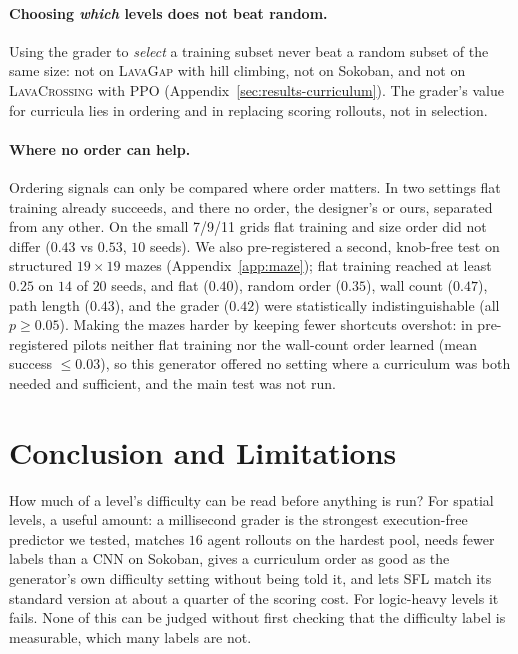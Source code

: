 \documentclass[twoside]{article}
\begin{document}
\paragraph{Choosing \emph{which} levels does not beat random.} Using the grader to \emph{select} a training subset never beat a random subset of the same size: not on \textsc{LavaGap} with hill climbing, not on Sokoban, and not on \textsc{LavaCrossing} with PPO (Appendix~\ref{sec:results-curriculum}). The grader's value for curricula lies in ordering and in replacing scoring rollouts, not in selection.

\paragraph{Where no order can help.} Ordering signals can only be compared where order matters. In two settings flat training already succeeds, and there no order, the designer's or ours, separated from any other. On the small 7/9/11 grids flat training and size order did not differ ($0.43$ vs $0.53$, $10$ seeds). We also pre-registered a second, knob-free test on structured $19\times19$ mazes (Appendix~\ref{app:maze}); flat training reached at least $0.25$ on $14$ of $20$ seeds, and flat ($0.40$), random order ($0.35$), wall count ($0.47$), path length ($0.43$), and the grader ($0.42$) were statistically indistinguishable (all $p\ge0.05$). Making the mazes harder by keeping fewer shortcuts overshot: in pre-registered pilots neither flat training nor the wall-count order learned (mean success $\le0.03$), so this generator offered no setting where a curriculum was both needed and sufficient, and the main test was not run.

\section{Conclusion and Limitations}
\label{sec:conclusion}

How much of a level's difficulty can be read before anything is run? For spatial levels, a useful amount: a millisecond grader is the strongest execution-free predictor we tested, matches $16$ agent rollouts on the hardest pool, needs fewer labels than a CNN on Sokoban, gives a curriculum order as good as the generator's own difficulty setting without being told it, and lets SFL match its standard version at about a quarter of the scoring cost. For logic-heavy levels it fails. None of this can be judged without first checking that the difficulty label is measurable, which many labels are not.
\end{document}
